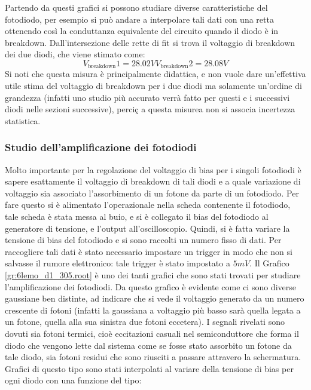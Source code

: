 Partendo da questi grafici si possono studiare diverse caratteristiche del fotodiodo, per esempio 
si può andare a interpolare tali dati con una retta ottenendo così la conduttanza equivalente del circuito quando il diodo è in breakdown.
Dall'intersezione delle rette di fit si trova il voltaggio di breakdown dei due diodi, che viene stimato come:
\begin{equation}
	V_\text{breakdown}1 = 28.02 V
	V_\text{breakdown}2 = 28.08 V
\end{equation}
Si noti che questa misura è principalmente didattica, e non vuole dare un'effettiva utile stima del voltaggio di breakdown per i due diodi ma solamente un'ordine di grandezza
(infatti uno studio più accurato verrà fatto per questi e i successivi diodi nelle sezioni successive), perciç a questa misurea non si associa incertezza statistica.

\subsubsection{Studio dell'amplificazione dei fotodiodi}
Molto importante per la regolazione del voltaggio di bias per i singoli fotodiodi è sapere esattamente il voltaggio di breakdown di tali diodi e a quale variazione di
voltaggio sia associato l'assorbimento di un fotone da parte di un fotodiodo. Per fare questo si è alimentato l'operazionale nella scheda contenente il fotodiodo, tale
scheda è stata messa al buio, e si è collegato il bias del fotodiodo al generatore di tensione, e l'output all'oscilloscopio. Quindi, si è fatta variare la tensione
di bias del fotodiodo e si sono raccolti un numero fisso di dati. Per raccogliere tali dati è stato necessario impostare un trigger in modo che non si salvasse il rumore elettronico: tale trigger è stato impostato a $5 mV$.
Il Grafico \ref{gr:6lemo_d1_305.root} è uno dei tanti grafici che sono stati
trovati per studiare l'amplificazione dei fotodiodi. Da questo grafico è evidente come ci sono diverse gaussiane ben distinte, ad indicare che si vede il voltaggio
generato da un numero crescente di fotoni (infatti la gaussiana a voltaggio più basso sarà quella legata a un fotone, quella alla sua sinistra due fotoni eccetera).
I segnali rivelati sono dovuti sia fotoni termici, cioè eccitazioni casuali nel semiconduttore che forma il diodo che vengono lette dal sistema come se fosse stato assorbito un fotone
da tale diodo, sia fotoni residui che sono riusciti a passare attravero la schermatura. Grafici di questo tipo sono stati interpolati al variare della tensione di bias per ogni diodo con una funzione del tipo:

